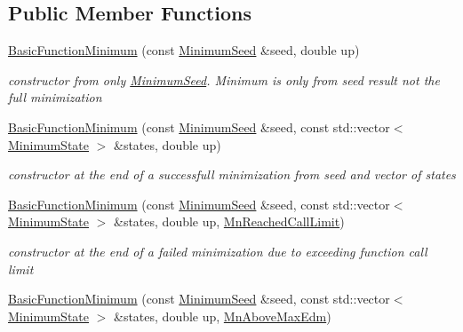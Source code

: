 \subsection*{Public Member Functions}
\begin{DoxyCompactItemize}
\item 
\mbox{\hyperlink{classROOT_1_1Minuit2_1_1BasicFunctionMinimum_a7482d18115a4dc6cd3a0690074c7bbb7}{Basic\+Function\+Minimum}} (const \mbox{\hyperlink{classROOT_1_1Minuit2_1_1MinimumSeed}{Minimum\+Seed}} \&seed, double up)
\begin{DoxyCompactList}\small\item\em constructor from only \mbox{\hyperlink{classROOT_1_1Minuit2_1_1MinimumSeed}{Minimum\+Seed}}. Minimum is only from seed result not the full minimization \end{DoxyCompactList}\item 
\mbox{\hyperlink{classROOT_1_1Minuit2_1_1BasicFunctionMinimum_a8a2f91243b896e3fe682c19ccd57a9bc}{Basic\+Function\+Minimum}} (const \mbox{\hyperlink{classROOT_1_1Minuit2_1_1MinimumSeed}{Minimum\+Seed}} \&seed, const std\+::vector$<$ \mbox{\hyperlink{classROOT_1_1Minuit2_1_1MinimumState}{Minimum\+State}} $>$ \&states, double up)
\begin{DoxyCompactList}\small\item\em constructor at the end of a successfull minimization from seed and vector of states \end{DoxyCompactList}\item 
\mbox{\hyperlink{classROOT_1_1Minuit2_1_1BasicFunctionMinimum_a2a15d2336acfb9f3be41de8e477c191a}{Basic\+Function\+Minimum}} (const \mbox{\hyperlink{classROOT_1_1Minuit2_1_1MinimumSeed}{Minimum\+Seed}} \&seed, const std\+::vector$<$ \mbox{\hyperlink{classROOT_1_1Minuit2_1_1MinimumState}{Minimum\+State}} $>$ \&states, double up, \mbox{\hyperlink{classROOT_1_1Minuit2_1_1BasicFunctionMinimum_1_1MnReachedCallLimit}{Mn\+Reached\+Call\+Limit}})
\begin{DoxyCompactList}\small\item\em constructor at the end of a failed minimization due to exceeding function call limit \end{DoxyCompactList}\item 
\mbox{\hyperlink{classROOT_1_1Minuit2_1_1BasicFunctionMinimum_ae30a460175a2bbf715f3ee0d6092c8b6}{Basic\+Function\+Minimum}} (const \mbox{\hyperlink{classROOT_1_1Minuit2_1_1MinimumSeed}{Minimum\+Seed}} \&seed, const std\+::vector$<$ \mbox{\hyperlink{classROOT_1_1Minuit2_1_1MinimumState}{Minimum\+State}} $>$ \&states, double up, \mbox{\hyperlink{classROOT_1_1Minuit2_1_1BasicFunctionMinimum_1_1MnAboveMaxEdm}{Mn\+Above\+Max\+Edm}})

\end{DoxyCompactItemize}
